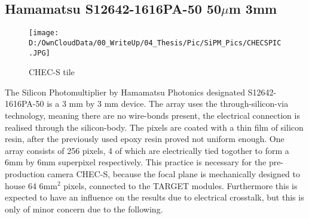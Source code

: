 \documentclass[12pt,article,type=msc,colorback,accentcolor=tud9c]{tudthesis}
\begin{document}
\clearpage
\subsection{Hamamatsu S12642-1616PA-50 50$\mu$m 3mm}
\begin{wrapfigure}{R}{0.3\textwidth}
\centering
\texttt{[image: D:/OwnCloudData/00\_WriteUp/04\_Thesis/Pic/SiPM\_Pics/CHECSPIC.JPG]}
\caption{\label{fig:CHECSTILE}CHEC-S tile}
\end{wrapfigure}
The Silicon Photomultiplier by Hamamatsu Photonics designated S12642-1616PA-50 is a 3 mm by 3 mm device. The array uses the through-silicon-via technology, meaning there are no wire-bonds present, the electrical connection is realised through the silicon-body. The pixels are coated with a thin film of silicon resin, after the previously used epoxy resin proved not uniform enough. One array consists of 256 pixels, 4 of which are electrically tied togother to form a 6mm by 6mm superpixel respectively. This practice is necessary for the pre-production camera CHEC-S, because the focal plane is mechanically designed to house 64 6mm$^{2}$ pixels, connected to the TARGET modules. Furthermore this is expected to have an influence on the results due to electrical crosstalk, but this is only of minor concern due to the following. 
\end{document}

